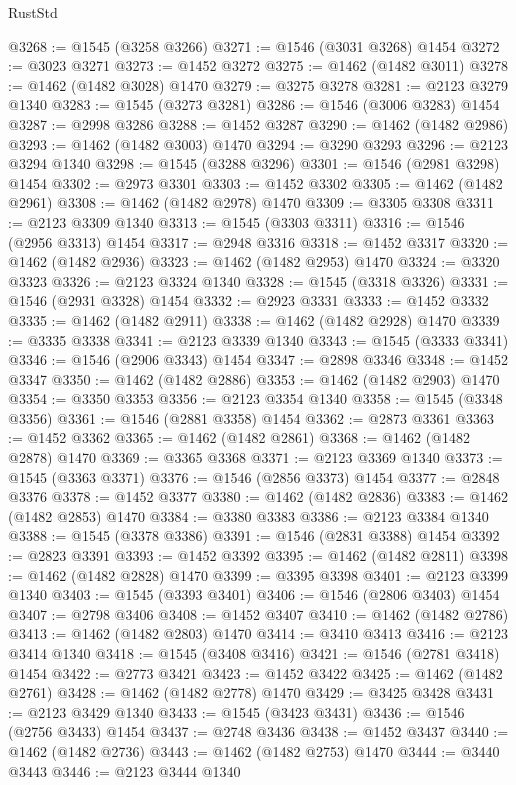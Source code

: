 \begin{lexlean}{RustStd}
\begin{coremodule}
{\begin{coremodule}
{{{{{{{{{{{{{{{{{{{{{{{{{{{{{{@3268 := @1545 (@3258 @3266)
@3271 := @1546 (@3031 @3268) @1454
@3272 := @3023 @3271
@3273 := @1452 @3272
@3275 := @1462 (@1482 @3011)
@3278 := @1462 (@1482 @3028) @1470
@3279 := @3275 @3278
@3281 := @2123 @3279 @1340
@3283 := @1545 (@3273 @3281)
@3286 := @1546 (@3006 @3283) @1454
@3287 := @2998 @3286
@3288 := @1452 @3287
@3290 := @1462 (@1482 @2986)
@3293 := @1462 (@1482 @3003) @1470
@3294 := @3290 @3293
@3296 := @2123 @3294 @1340
@3298 := @1545 (@3288 @3296)
@3301 := @1546 (@2981 @3298) @1454
@3302 := @2973 @3301
@3303 := @1452 @3302
@3305 := @1462 (@1482 @2961)
@3308 := @1462 (@1482 @2978) @1470
@3309 := @3305 @3308
@3311 := @2123 @3309 @1340
@3313 := @1545 (@3303 @3311)
@3316 := @1546 (@2956 @3313) @1454
@3317 := @2948 @3316
@3318 := @1452 @3317
@3320 := @1462 (@1482 @2936)
@3323 := @1462 (@1482 @2953) @1470
@3324 := @3320 @3323
@3326 := @2123 @3324 @1340
@3328 := @1545 (@3318 @3326)
@3331 := @1546 (@2931 @3328) @1454
@3332 := @2923 @3331
@3333 := @1452 @3332
@3335 := @1462 (@1482 @2911)
@3338 := @1462 (@1482 @2928) @1470
@3339 := @3335 @3338
@3341 := @2123 @3339 @1340
@3343 := @1545 (@3333 @3341)
@3346 := @1546 (@2906 @3343) @1454
@3347 := @2898 @3346
@3348 := @1452 @3347
@3350 := @1462 (@1482 @2886)
@3353 := @1462 (@1482 @2903) @1470
@3354 := @3350 @3353
@3356 := @2123 @3354 @1340
@3358 := @1545 (@3348 @3356)
@3361 := @1546 (@2881 @3358) @1454
@3362 := @2873 @3361
@3363 := @1452 @3362
@3365 := @1462 (@1482 @2861)
@3368 := @1462 (@1482 @2878) @1470
@3369 := @3365 @3368
@3371 := @2123 @3369 @1340
@3373 := @1545 (@3363 @3371)
@3376 := @1546 (@2856 @3373) @1454
@3377 := @2848 @3376
@3378 := @1452 @3377
@3380 := @1462 (@1482 @2836)
@3383 := @1462 (@1482 @2853) @1470
@3384 := @3380 @3383
@3386 := @2123 @3384 @1340
@3388 := @1545 (@3378 @3386)
@3391 := @1546 (@2831 @3388) @1454
@3392 := @2823 @3391
@3393 := @1452 @3392
@3395 := @1462 (@1482 @2811)
@3398 := @1462 (@1482 @2828) @1470
@3399 := @3395 @3398
@3401 := @2123 @3399 @1340
@3403 := @1545 (@3393 @3401)
@3406 := @1546 (@2806 @3403) @1454
@3407 := @2798 @3406
@3408 := @1452 @3407
@3410 := @1462 (@1482 @2786)
@3413 := @1462 (@1482 @2803) @1470
@3414 := @3410 @3413
@3416 := @2123 @3414 @1340
@3418 := @1545 (@3408 @3416)
@3421 := @1546 (@2781 @3418) @1454
@3422 := @2773 @3421
@3423 := @1452 @3422
@3425 := @1462 (@1482 @2761)
@3428 := @1462 (@1482 @2778) @1470
@3429 := @3425 @3428
@3431 := @2123 @3429 @1340
@3433 := @1545 (@3423 @3431)
@3436 := @1546 (@2756 @3433) @1454
@3437 := @2748 @3436
@3438 := @1452 @3437
@3440 := @1462 (@1482 @2736)
@3443 := @1462 (@1482 @2753) @1470
@3444 := @3440 @3443
@3446 := @2123 @3444 @1340
}}}}}}}}}}}}}}}}}}}}}}}}}}}}}}
\end{coremodule}}
\end{coremodule}
\end{lexlean}
